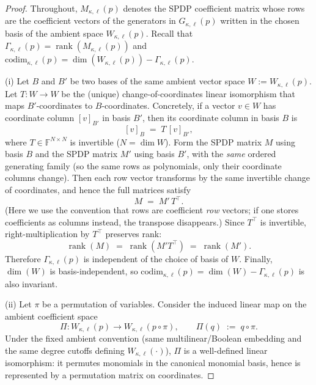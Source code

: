 \documentclass[12pt]{article}
\theoremstyle{definition}
\theoremstyle{remark}
\begin{document}
\begin{proof}
Throughout, $M_{\kappa,\ell}(p)$ denotes the SPDP coefficient matrix whose rows are the
coefficient vectors of the generators in $G_{\kappa,\ell}(p)$ written in the chosen
basis of the ambient space $W_{\kappa,\ell}(p)$. Recall that
$\Gamma_{\kappa,\ell}(p)=\operatorname{rank}(M_{\kappa,\ell}(p))$ and
$\mathrm{codim}_{\kappa,\ell}(p)=\dim(W_{\kappa,\ell}(p))-\Gamma_{\kappa,\ell}(p)$.

\smallskip
\noindent
(i) Let $B$ and $B'$ be two bases of the same ambient vector space $W:=W_{\kappa,\ell}(p)$.
Let $T:W\to W$ be the (unique) change-of-coordinates linear isomorphism that maps
$B'$-coordinates to $B$-coordinates. Concretely, if a vector $v\in W$ has coordinate
column $[v]_{B'}$ in basis $B'$, then its coordinate column in basis $B$ is
\[
[v]_B \;=\; T\,[v]_{B'},
\]
where $T\in \mathbb{F}^{N\times N}$ is invertible ($N=\dim W$).
Form the SPDP matrix $M$ using basis $B$ and the SPDP matrix $M'$ using basis $B'$,
with the \emph{same} ordered generating family (so the same rows as polynomials,
only their coordinate columns change). Then each row vector transforms by the same
invertible change of coordinates, and hence the full matrices satisfy
\[
M \;=\; M' \, T^{\top}.
\]
(Here we use the convention that rows are coefficient \emph{row} vectors; if one
stores coefficients as columns instead, the transpose disappears.)
Since $T^{\top}$ is invertible, right-multiplication by $T^{\top}$ preserves rank:
\[
\operatorname{rank}(M) \;=\; \operatorname{rank}(M' T^{\top})
\;=\; \operatorname{rank}(M').
\]
Therefore $\Gamma_{\kappa,\ell}(p)$ is independent of the choice of basis of $W$.
Finally, $\dim(W)$ is basis-independent, so
$\mathrm{codim}_{\kappa,\ell}(p)=\dim(W)-\Gamma_{\kappa,\ell}(p)$ is also invariant.

\smallskip
\noindent
(ii) Let $\pi$ be a permutation of variables. Consider the induced linear map on the
ambient coefficient space
\[
\Pi:W_{\kappa,\ell}(p)\to W_{\kappa,\ell}(p\circ \pi),
\qquad
\Pi(q)\;:=\; q\circ \pi.
\]
Under the fixed ambient convention (same multilinear/Boolean embedding and the
same degree cutoffs defining $W_{\kappa,\ell}(\cdot)$), $\Pi$ is a well-defined linear
isomorphism: it permutes monomials in the canonical monomial basis, hence is
represented by a permutation matrix on coordinates.


\end{proof}
\end{document}
